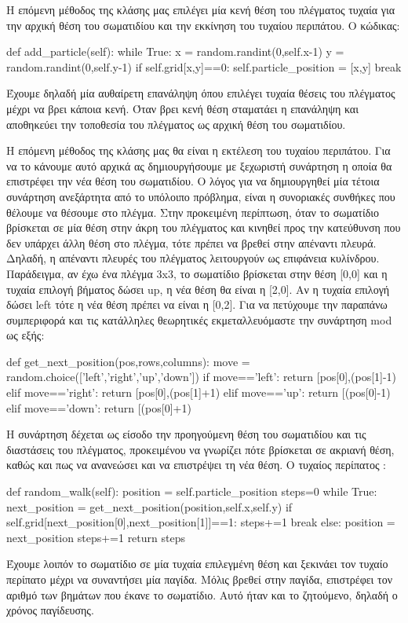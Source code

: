 Η επόμενη μέθοδος της κλάσης μας επιλέγει μία κενή θέση του πλέγματος τυχαία για την αρχική θέση του σωματιδίου και την εκκίνηση του τυχαίου περιπάτου. 
\newpage
\noindent
Ο κώδικας: 
\en
\begin{python}
def add_particle(self):
    while True:
        x = random.randint(0,self.x-1)
        y = random.randint(0,self.y-1)
        if self.grid[x,y]==0:
            self.particle_position = [x,y]
            break
\end{python}
\gr 
Έχουμε δηλαδή μία αυθαίρετη επανάληψη όπου επιλέγει τυχαία θέσεις του πλέγματος μέχρι να βρει κάποια κενή. Όταν βρει κενή θέση σταματάει η επανάληψη και αποθηκεύει την τοποθεσία του πλέγματος ως αρχική θέση του σωματιδίου.

Η επόμενη μέθοδος της κλάσης μας θα είναι η εκτέλεση του τυχαίου περιπάτου. Για να το κάνουμε αυτό αρχικά ας δημιουργήσουμε με ξεχωριστή συνάρτηση η οποία θα επιστρέφει την νέα θέση του σωματιδίου. Ο λόγος για να δημιουργηθεί μία τέτοια συνάρτηση ανεξάρτητα από το υπόλοιπο πρόβλημα, είναι η συνοριακές συνθήκες που θέλουμε να θέσουμε στο πλέγμα. Στην προκειμένη περίπτωση, όταν το σωματίδιο βρίσκεται σε μία θέση στην άκρη του πλέγματος και κινηθεί προς την κατεύθυνση που δεν υπάρχει άλλη θέση στο πλέγμα, τότε πρέπει να βρεθεί στην απέναντι πλευρά. Δηλαδή, η απέναντι πλευρές του πλέγματος λειτουργούν ως επιφάνεια κυλίνδρου. Παράδειγμα, αν έχω ένα πλέγμα 3{\en x}3, το σωματίδιο βρίσκεται στην θέση [0,0] και η τυχαία επιλογή βήματος δώσει {\en up}, η νέα θέση θα είναι η [2,0]. Αν η τυχαία επιλογή δώσει {\en left} τότε η νέα θέση πρέπει να είναι η [0,2]. Για να πετύχουμε την παραπάνω συμπεριφορά και τις κατάλληλες θεωρητικές εκμεταλλευόμαστε την συνάρτηση {\en mod} ως εξής:
\en
\begin{python}
def get_next_position(pos,rows,columns):
    move = random.choice(['left','right','up','down'])
    if move=='left':
        return [pos[0],(pos[1]-1)%
    elif move=='right':
        return [pos[0],(pos[1]+1)%
    elif move=='up':
        return [(pos[0]-1)%
    elif move=='down':
        return [(pos[0]+1)%
\end{python}
\gr 
Η συνάρτηση δέχεται ως είσοδο την προηγούμενη θέση του σωματιδίου και τις διαστάσεις του πλέγματος,  προκειμένου να γνωρίζει πότε βρίσκεται σε ακριανή θέση, καθώς και πως να ανανεώσει και να επιστρέψει τη νέα θέση. 
\newpage
\noindent
Ο τυχαίος περίπατος :
\en 
\begin{python}
def random_walk(self):
    position = self.particle_position
    steps=0
    while True:
        next_position = get_next_position(position,self.x,self.y)
        if self.grid[next_position[0],next_position[1]]==1:
            steps+=1
            break
        else:
            position = next_position
            steps+=1
    return steps
\end{python}
\gr 
Έχουμε λοιπόν το σωματίδιο σε μία τυχαία επιλεγμένη θέση και ξεκινάει τον τυχαίο περίπατο μέχρι να συναντήσει μία παγίδα. Μόλις βρεθεί στην παγίδα, επιστρέφει τον αριθμό των βημάτων που έκανε το σωματίδιο. Αυτό ήταν και το ζητούμενο, δηλαδή ο χρόνος παγίδευσης.


